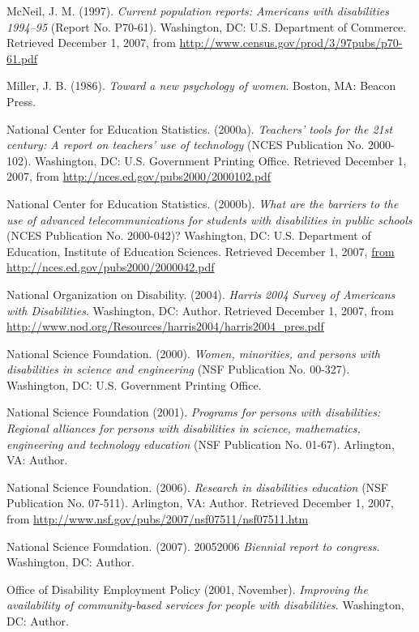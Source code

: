 \documentclass[11.5pt]{sig-alternate} %
\begin{document}
McNeil, J. M. (1997).\textit{ Current population reports: Americans with disabilities 1994–95} (Report No. P70-61). Washington, DC: U.S. Department of Commerce. Retrieved December 1, 2007, from \url{http://www.census.gov/prod/3/97pubs/p70-61.pdf}
 
Miller, J. B. (1986). \textit{Toward a new psychology of women}. Boston, MA: Beacon Press.  
 
National Center for Education Statistics. (2000a). \textit{Teachers' tools for the 21st century: A report on teachers' use of technology} (NCES Publication No. 2000-102). Washington, DC: U.S. Government Printing Office. Retrieved December 1, 2007, from \url{http://nces.ed.gov/pubs2000/2000102.pdf}
 
National Center for Education Statistics. (2000b). \textit{What are the barriers to the use of advanced telecommunications for students with disabilities in public schools} (NCES Publication No. 2000-042)? Washington, DC: U.S. Department of Education, Institute of Education Sciences. Retrieved December 1, 2007, \url{from http://nces.ed.gov/pubs2000/2000042.pdf}
 
National Organization on Disability. (2004). \textit{Harris 2004 Survey of Americans with Disabilities}. Washington, DC: Author. Retrieved December 1, 2007, from \url{http://www.nod.org/Resources/harris2004/harris2004\_pres.pdf}
 
National Science Foundation. (2000). \textit{Women, minorities, and persons with disabilities in science and engineering} (NSF Publication No. 00-327). Washington, DC: U.S. Government Printing Office. 
 
National Science Foundation (2001). \textit{Programs for persons with disabilities: Regional alliances for persons with disabilities in science, mathematics, engineering and technology education} (NSF Publication No. 01-67). Arlington, VA: 
Author. 
 
National Science Foundation. (2006). \textit{Research in disabilities education} (NSF Publication No. 07-511). Arlington, VA: Author. Retrieved December 1, 2007, from \url{http://www.nsf.gov/pubs/2007/nsf07511/nsf07511.htm}  
 
National Science Foundation. (2007). 20052006 \textit{Biennial report to congress}. Washington, DC: Author. 
 
Office of Disability Employment Policy (2001, November). \textit{Improving the availability of community-based services for people with disabilities}. Washington, DC: Author. 
 
\end{document}
